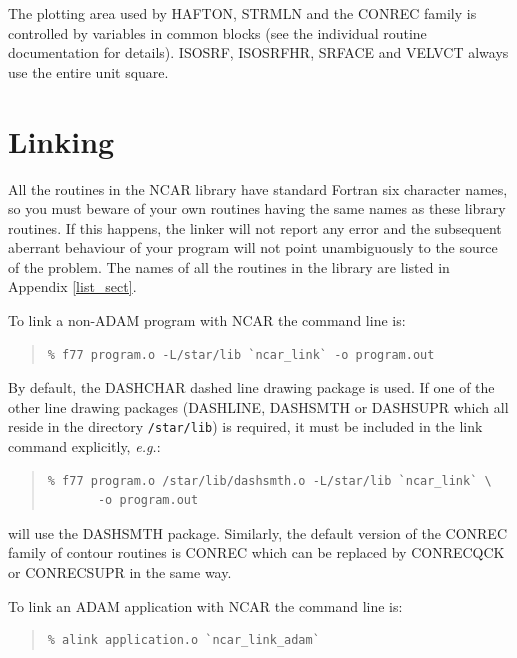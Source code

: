 \documentclass[twoside,11pt]{article}
\newcommand{\xlabel}[1]{}
\renewcommand{\_}{\texttt{\symbol{95}}}
\begin{document}
The plotting area used by HAFTON, STRMLN and the CONREC family is controlled
by variables in common blocks (see the individual routine documentation for
details).
ISOSRF, ISOSRFHR, SRFACE and VELVCT always use the entire unit
square.


\section{\xlabel{linking}Linking}

All the routines in the NCAR library have standard Fortran six
character names, so you must beware of your own routines having the
same names as these library routines.  If this happens, the linker will
not report any error and the subsequent aberrant behaviour of your
program will not point unambiguously to the source of the problem.  The
names of all the routines in the library are listed in Appendix
\ref{list_sect}.

\begin{sloppypar}
To link a non-ADAM program with NCAR the command line is:
\end{sloppypar}

\begin{quote}
\begin{small}
\begin{verbatim}
% f77 program.o -L/star/lib `ncar_link` -o program.out
\end{verbatim}
\end{small}
\end{quote}

By default, the DASHCHAR dashed line drawing package is used.  If one
of the other line drawing packages (DASHLINE, DASHSMTH or DASHSUPR
which all reside in the directory \texttt{/star/lib}) is required, it must
be included in the link command explicitly, \emph{e.g.}:

\begin{quote}
\begin{verbatim}
% f77 program.o /star/lib/dashsmth.o -L/star/lib `ncar_link` \
       -o program.out
\end{verbatim}
\end{quote}

will use the DASHSMTH package.
Similarly, the default version of the CONREC family of contour routines is
CONREC which can be replaced by CONRECQCK or CONRECSUPR in the same way.

To link an ADAM application with NCAR the command line is:

\begin{quote}
\begin{verbatim}
% alink application.o `ncar_link_adam`
\end{verbatim}
\end{quote}
\end{document}
